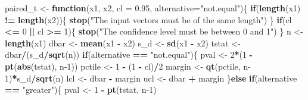 \documentclass[
]{krantz}
\newenvironment{Shaded}{\begin{snugshade}}{\end{snugshade}}
\newcommand{\ControlFlowTok}[1]{\textcolor[rgb]{0.13,0.29,0.53}{\textbf{#1}}}
\newcommand{\DataTypeTok}[1]{\textcolor[rgb]{0.13,0.29,0.53}{#1}}
\newcommand{\DecValTok}[1]{\textcolor[rgb]{0.00,0.00,0.81}{#1}}
\newcommand{\FloatTok}[1]{\textcolor[rgb]{0.00,0.00,0.81}{#1}}
\newcommand{\KeywordTok}[1]{\textcolor[rgb]{0.13,0.29,0.53}{\textbf{#1}}}
\newcommand{\NormalTok}[1]{#1}
\newcommand{\OperatorTok}[1]{\textcolor[rgb]{0.81,0.36,0.00}{\textbf{#1}}}
\newcommand{\StringTok}[1]{\textcolor[rgb]{0.31,0.60,0.02}{#1}}
\begin{document}
\begin{Shaded}
\begin{Highlighting}[]
\NormalTok{paired\_t \textless{}{-}}\StringTok{ }\ControlFlowTok{function}\NormalTok{(x1, x2, }\DataTypeTok{cl =} \FloatTok{0.95}\NormalTok{, }\DataTypeTok{alternative=}\StringTok{"not.equal"}\NormalTok{)\{}
    \ControlFlowTok{if}\NormalTok{(}\KeywordTok{length}\NormalTok{(x1) }\OperatorTok{!=}\StringTok{ }\KeywordTok{length}\NormalTok{(x2))\{}
        \KeywordTok{stop}\NormalTok{(}\StringTok{"The input vectors must be of the same length"}\NormalTok{)}
\NormalTok{        \}}
    \ControlFlowTok{if}\NormalTok{(cl }\OperatorTok{\textless{}=}\StringTok{ }\DecValTok{0} \OperatorTok{||}\StringTok{ }\NormalTok{cl }\OperatorTok{\textgreater{}=}\StringTok{ }\DecValTok{1}\NormalTok{)\{}
        \KeywordTok{stop}\NormalTok{(}\StringTok{"The confidence level must be between 0 and 1"}\NormalTok{)}
\NormalTok{        \}}
\NormalTok{    n \textless{}{-}}\StringTok{ }\KeywordTok{length}\NormalTok{(x1)}
\NormalTok{    dbar \textless{}{-}}\StringTok{ }\KeywordTok{mean}\NormalTok{(x1 }\OperatorTok{{-}}\StringTok{ }\NormalTok{x2)}
\NormalTok{    s\_d \textless{}{-}}\StringTok{ }\KeywordTok{sd}\NormalTok{(x1 }\OperatorTok{{-}}\StringTok{ }\NormalTok{x2)}
\NormalTok{    tstat \textless{}{-}}\StringTok{ }\NormalTok{dbar}\OperatorTok{/}\NormalTok{(s\_d}\OperatorTok{/}\KeywordTok{sqrt}\NormalTok{(n))}
    \ControlFlowTok{if}\NormalTok{(alternative }\OperatorTok{==}\StringTok{ "not.equal"}\NormalTok{)\{}
\NormalTok{        pval \textless{}{-}}\StringTok{ }\DecValTok{2}\OperatorTok{*}\NormalTok{(}\DecValTok{1} \OperatorTok{{-}}\StringTok{ }\KeywordTok{pt}\NormalTok{(}\KeywordTok{abs}\NormalTok{(tstat), n}\DecValTok{{-}1}\NormalTok{))}
\NormalTok{        pctile \textless{}{-}}\StringTok{ }\DecValTok{1} \OperatorTok{{-}}\StringTok{ }\NormalTok{(}\DecValTok{1} \OperatorTok{{-}}\StringTok{ }\NormalTok{cl)}\OperatorTok{/}\DecValTok{2}
\NormalTok{        margin \textless{}{-}}\StringTok{ }\KeywordTok{qt}\NormalTok{(pctile, n}\DecValTok{{-}1}\NormalTok{)}\OperatorTok{*}\NormalTok{s\_d}\OperatorTok{/}\KeywordTok{sqrt}\NormalTok{(n)}
\NormalTok{        lcl \textless{}{-}}\StringTok{ }\NormalTok{dbar }\OperatorTok{{-}}\StringTok{ }\NormalTok{margin}
\NormalTok{        ucl \textless{}{-}}\StringTok{ }\NormalTok{dbar }\OperatorTok{+}\StringTok{ }\NormalTok{margin}
\NormalTok{    \}}\ControlFlowTok{else} \ControlFlowTok{if}\NormalTok{(alternative }\OperatorTok{==}\StringTok{ "greater"}\NormalTok{)\{}
\NormalTok{        pval \textless{}{-}}\StringTok{ }\DecValTok{1} \OperatorTok{{-}}\StringTok{ }\KeywordTok{pt}\NormalTok{(tstat, n}\DecValTok{{-}1}\NormalTok{)}

\end{Highlighting}
\end{Shaded}
\end{document}
